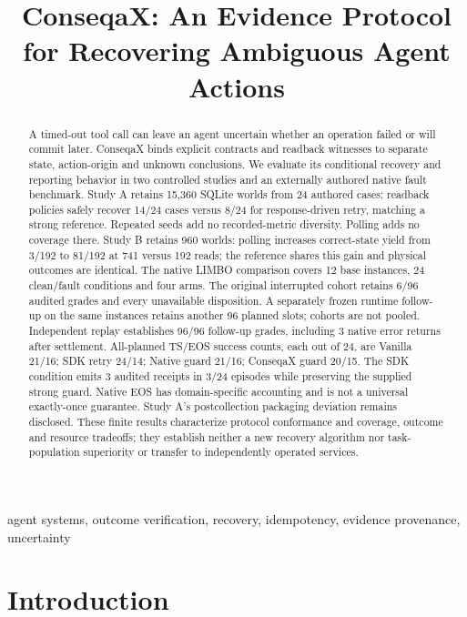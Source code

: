 \documentclass[conference]{IEEEtran}
\title{ConseqaX: An Evidence Protocol for Recovering Ambiguous Agent Actions}
\author{\IEEEauthorblockN{Devrajsinh Jhala}\IEEEauthorblockA{Independent Researcher}}
\begin{document}
\raggedbottom
\maketitle

\begin{abstract}
A timed-out tool call can leave an agent uncertain whether an operation failed or will commit later. ConseqaX binds explicit contracts and readback witnesses to separate state, action-origin and unknown conclusions. We evaluate its conditional recovery and reporting behavior in two controlled studies and an externally authored native fault benchmark. Study A retains 15,360 SQLite worlds from 24 authored cases: readback policies safely recover 14/24 cases versus 8/24 for response-driven retry, matching a strong reference. Repeated seeds add no recorded-metric diversity. Polling adds no coverage there. Study B retains 960 worlds: polling increases correct-state yield from 3/192 to 81/192 at 741 versus 192 reads; the reference shares this gain and physical outcomes are identical. The native LIMBO comparison covers 12 base instances, 24 clean/fault conditions and four arms. The original interrupted cohort retains 6/96 audited grades and every unavailable disposition. A separately frozen runtime follow-up on the same instances retains another 96 planned slots; cohorts are not pooled. Independent replay establishes 96/96 follow-up grades, including 3 native error returns after settlement. All-planned TS/EOS success counts, each out of 24, are Vanilla 21/16; SDK retry 24/14; Native guard 21/16; ConseqaX guard 20/15. The SDK condition emits 3 audited receipts in 3/24 episodes while preserving the supplied strong guard. Native EOS has domain-specific accounting and is not a universal exactly-once guarantee. Study A's postcollection packaging deviation remains disclosed. These finite results characterize protocol conformance and coverage, outcome and resource tradeoffs; they establish neither a new recovery algorithm nor task-population superiority or transfer to independently operated services.
\end{abstract}
\begin{IEEEkeywords}agent systems, outcome verification, recovery, idempotency, evidence provenance, uncertainty\end{IEEEkeywords}

\section{Introduction}
\end{document}
